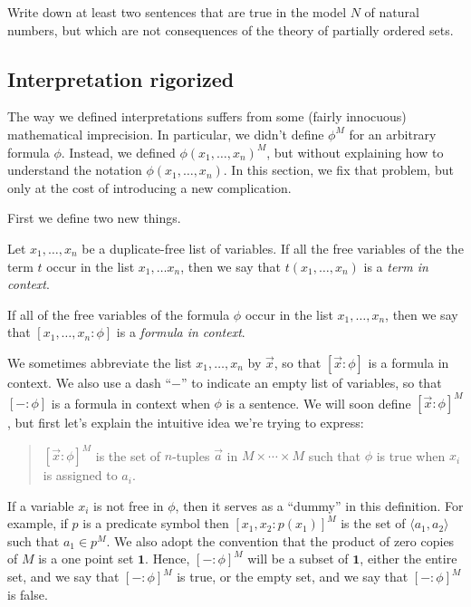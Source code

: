 \begin{exercise} Write down at least two sentences that are true in
  the model $N$ of natural numbers, but which are not consequences of
  the theory of partially ordered sets. \end{exercise}

      

\subsection{Interpretation rigorized}

The way we defined interpretations suffers from some (fairly
innocuous) mathematical imprecision.  In particular, we didn't define
$\phi ^M$ for an arbitrary formula $\phi$.  Instead, we defined
$\phi (x_1,\dots ,x_n)^M$, but without explaining how to understand
the notation $\phi (x_1,\dots ,x_n)$.  In this section, we fix that
problem, but only at the cost of introducing a new complication.

First we define two new things.
\begin{defn} Let $x_1,\dots ,x_n$ be a duplicate-free list of
  variables.  If all the free variables of the the term $t$ occur in
  the list $x_1,\dots x_n$, then we say that $t(x_1,\dots ,x_n)$ is a
  \emph{term in context}. \end{defn}
\begin{defn} If all of the free variables of the formula $\phi$ occur
  in the list $x_1,\dots ,x_n$, then we say that
  $[x_1,\dots ,x_n:\phi ]$ is a \emph{formula in context}.
\end{defn} We sometimes abbreviate the list $x_1,\dots ,x_n$ by
$\vec{x}$, so that $[\vec{x}:\phi ]$ is a formula in context.  We also
use a dash ``$-$'' to indicate an empty list of variables, so that
$[-:\phi ]$ is a formula in context when $\phi$ is a sentence.  We
will soon define $[\vec{x}:\phi ]^M$, but first let's explain the
intuitive idea we're trying to express:
\begin{quote} $[\vec{x}:\phi ]^M$ is the set of $n$-tuples $\vec{a}$
  in $M\times \cdots \times M$ such that $\phi$ is true when $x_i$ is
  assigned to $a_i$. \end{quote} If a variable $x_i$ is not free in
$\phi$, then it serves as a ``dummy'' in this definition.  For
example, if $p$ is a predicate symbol then \mbox{$[x_1,x_2:p(x_1)]^M$}
is the set of $\langle a_1,a_2\rangle$ such that $a_1\in p^M$.  We
also adopt the convention that the product of zero copies of $M$ is a
one point set $\mathbf{1}$.  Hence, $[-:\phi ]^M$ will be a subset of
$\mathbf{1}$, either the entire set, and we say that $[-:\phi ]^M$ is
true, or the empty set, and we say that $[- :\phi ]^M$ is false.

